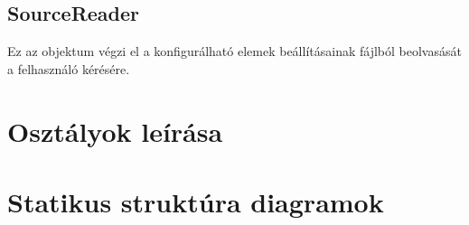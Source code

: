 \subsection{\bf SourceReader}
Ez az objektum végzi el a konfigurálható elemek beállításainak fájlból beolvasását a felhasználó kérésére.

\section{Osztályok leírása}






\section{Statikus struktúra diagramok}

